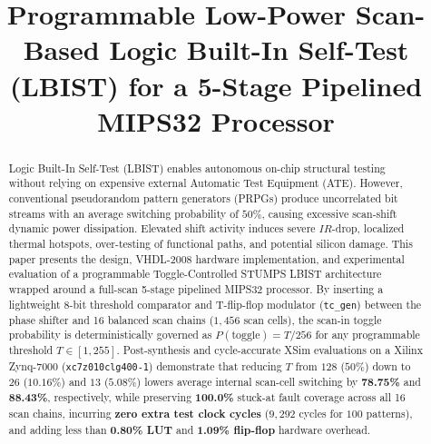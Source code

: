 \documentclass[conference]{IEEEtran}
\begin{document}
\title{Programmable Low-Power Scan-Based Logic Built-In Self-Test (LBIST) for a 5-Stage Pipelined MIPS32 Processor}

\author{
}

\maketitle

\begin{abstract}
Logic Built-In Self-Test (LBIST) enables autonomous on-chip structural testing without relying on expensive external Automatic Test Equipment (ATE). However, conventional pseudorandom pattern generators (PRPGs) produce uncorrelated bit streams with an average switching probability of $50\%$, causing excessive scan-shift dynamic power dissipation. Elevated shift activity induces severe $IR$-drop, localized thermal hotspots, over-testing of functional paths, and potential silicon damage. This paper presents the design, VHDL-2008 hardware implementation, and experimental evaluation of a programmable Toggle-Controlled STUMPS LBIST architecture wrapped around a full-scan 5-stage pipelined MIPS32 processor. By inserting a lightweight 8-bit threshold comparator and T-flip-flop modulator (\texttt{tc\_gen}) between the phase shifter and 16 balanced scan chains ($1,456$ scan cells), the scan-in toggle probability is deterministically governed as $P(\text{toggle}) = T/256$ for any programmable threshold $T \in [1, 255]$. Post-synthesis and cycle-accurate XSim evaluations on a Xilinx Zynq-7000 (\texttt{xc7z010clg400-1}) demonstrate that reducing $T$ from $128$ ($50\%$) down to $26$ ($10.16\%$) and $13$ ($5.08\%$) lowers average internal scan-cell switching by \textbf{78.75\%} and \textbf{88.43\%}, respectively, while preserving \textbf{100.0\%} stuck-at fault coverage across all 16 scan chains, incurring \textbf{zero extra test clock cycles} ($9,292$ cycles for $100$ patterns), and adding less than \textbf{0.80\% LUT} and \textbf{1.09\% flip-flop} hardware overhead.
\end{abstract}
\end{document}
